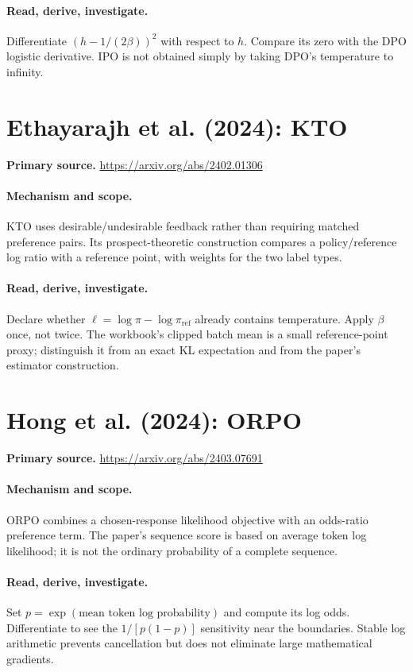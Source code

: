 \documentclass[11pt]{scrartcl}
\begin{document}
\paragraph{Read, derive, investigate.} Differentiate $(h-1/(2\beta))^2$ with respect to $h$. Compare its zero with the DPO logistic derivative. IPO is not obtained simply by taking DPO's temperature to infinity.

\section{Ethayarajh et al. (2024): KTO}
\noindent\textbf{Primary source.} \url{https://arxiv.org/abs/2402.01306}

\paragraph{Mechanism and scope.} KTO uses desirable/undesirable feedback rather than requiring matched preference pairs. Its prospect-theoretic construction compares a policy/reference log ratio with a reference point, with weights for the two label types.

\paragraph{Read, derive, investigate.} Declare whether $\ell=\log\pi-\log\pi_{\mathrm{ref}}$ already contains temperature. Apply $\beta$ once, not twice. The workbook's clipped batch mean is a small reference-point proxy; distinguish it from an exact KL expectation and from the paper's estimator construction.

\section{Hong et al. (2024): ORPO}
\noindent\textbf{Primary source.} \url{https://arxiv.org/abs/2403.07691}

\paragraph{Mechanism and scope.} ORPO combines a chosen-response likelihood objective with an odds-ratio preference term. The paper's sequence score is based on average token log likelihood; it is not the ordinary probability of a complete sequence.

\paragraph{Read, derive, investigate.} Set $p=\exp(\text{mean token log probability})$ and compute its log odds. Differentiate to see the $1/[p(1-p)]$ sensitivity near the boundaries. Stable log arithmetic prevents cancellation but does not eliminate large mathematical gradients.
\end{document}
